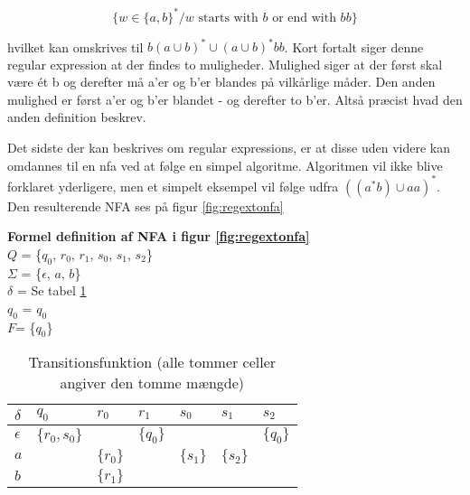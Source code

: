 $$ \{w \in \{a, b\}^* / w \text{ starts with }b \text{ or end with }bb\} $$

\noindent hvilket kan omskrives til $b(a \cup b)^* \cup (a \cup b)^* bb$. Kort fortalt siger denne regular expression at der findes to muligheder. Mulighed siger at der først skal være ét b og derefter må a'er og b'er blandes på vilkårlige måder. Den anden mulighed er først a'er og b'er blandet - og derefter to b'er. Altså præcist hvad den anden definition beskrev.

Det sidste der kan beskrives om regular expressions, er at disse uden videre kan omdannes til en \gls{nfa} ved at følge en simpel algoritme. Algoritmen vil ikke blive forklaret yderligere, men et simpelt eksempel vil følge udfra $((a^*b) \cup aa)^*$. Den resulterende NFA ses på figur \ref{fig:regextonfa}


\noindent \textbf{Formel definition af NFA i figur \ref{fig:regextonfa}}\\
\noindent $Q$ = \{$q_0$, $r_0$, $r_1$, $s_0$, $s_1$, $s_2$\}\\
\noindent $\Sigma$ = \{$\epsilon$, $a$, $b$\}\\
\noindent $\delta$ = Se tabel \ref{tab:regextonfa}\\
\noindent $q_0$ = $q_0$\\
\noindent $F$= \{$q_0$\}\\

\begin{table}[H]
\centering
\footnotesize
{}
\begin{tabular}{l@{\hskip\tabcolsep\vrule width 1pt\hskip\tabcolsep}l|l|l|l|l|l}

$\delta$   & $q_0$          & $r_0$     & $r_1$     & $s_0$     & $s_1$     & $s_2$ \\ \bottomrule
$\epsilon$ & $\{r_0, s_0\}$ &           & $\{q_0\}$ &           &           & $\{q_0\}$ \\
$a$        &                & $\{r_0\}$ &           & $\{s_1\}$ & $\{s_2\}$ &       \\
$b$        &                & $\{r_1\}$ &           &           &           &

\end{tabular}
	\caption{Transitionsfunktion (alle tommer celler angiver den tomme mængde)}
    \label{tab:regextonfa}
\end{table}



